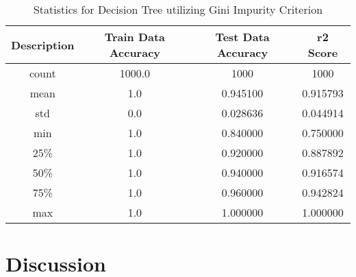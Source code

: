 \documentclass[journal]{IEEEtran}
\begin{document}
\begin{table}[h!]
\centering
\begin{tabular}{ c | c c c }
    Description & Train Data Accuracy & Test Data Accuracy & r2 Score \\ 
\hline
count & 1000.0    & 1000 & 1000  \\
mean  &    1.0    &    0.945100   &  0.915793 \\
std   &    0.0    &    0.028636   &  0.044914 \\
min   &    1.0    &    0.840000   &  0.750000 \\
25\%  &     1.0   &     0.920000  &   0.887892 \\
50\%  &     1.0   &     0.940000  &   0.916574 \\
75\%  &     1.0   &     0.960000  &   0.942824 \\
max   &   1.0     &   1.000000    & 1.000000
\end{tabular}
\caption{Statistics for Decision Tree utilizing Gini Impurity Criterion}
\label{table:dtGI}
\end{table}


\section{Discussion}


\begin{thebibliography}{00}

\end{thebibliography}
\end{document}
